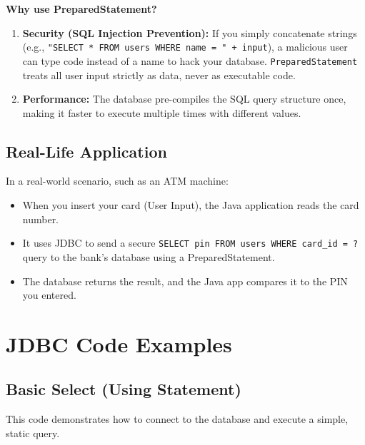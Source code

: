 \documentclass[12pt,a4paper]{article}
\begin{document}
\textbf{Why use PreparedStatement?}
\begin{enumerate}
    \item \textbf{Security (SQL Injection Prevention):} If you simply concatenate strings (e.g., \texttt{"SELECT * FROM users WHERE name = " + input}), a malicious user can type code instead of a name to hack your database. \texttt{PreparedStatement} treats all user input strictly as data, never as executable code.
    \item \textbf{Performance:} The database pre-compiles the SQL query structure once, making it faster to execute multiple times with different values.
\end{enumerate}

\subsection{Real-Life Application}
In a real-world scenario, such as an ATM machine:
\begin{itemize}
    \item When you insert your card (User Input), the Java application reads the card number.
    \item It uses JDBC to send a secure \texttt{SELECT pin FROM users WHERE card\_id = ?} query to the bank's database using a PreparedStatement.
    \item The database returns the result, and the Java app compares it to the PIN you entered.
\end{itemize}

\newpage
\section{JDBC Code Examples}

\subsection{Basic Select (Using Statement)}
This code demonstrates how to connect to the database and execute a simple, static query.
\end{document}
